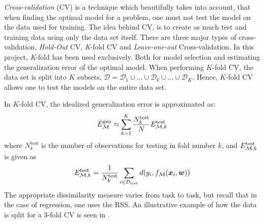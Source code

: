 \emph{Cross-validation} (CV) is a technique which beautifully takes into account, that when finding the optimal model for a problem, one must not test the model on the data used for training. The idea behind CV, is to create as much test and training data using only the data set itself. There are three major types of cross-validation, \emph{Hold-Out} CV, \emph{K}-fold CV and \emph{Leave-one-out} Cross-validation\citep{allhailkingMorten}. In this project, \emph{K}-fold has been used exclusively. Both for model selection and estimating the generalization error of the optimal model. When performing $K$-fold CV, the data set is split into $K$ subsets, $\mathcal{D} = \mathcal{D}_1 \cup  ... \cup \mathcal{D}_k \cup ... \cup \mathcal{D}_K$. Hence, $K$-fold CV allows one to test the models on the entire data set.

In $K$-fold CV, the idealized generalization error  is approximated as:
\begin{equation}\label{eq:gen_error}
    \hat{E}_{\mathcal{M}}^{\mathrm{gen}} \approx \sum_{k=1}^K \dfrac{N_{k}^{\mathrm{test}}}{N}   E_{\mathcal{M},k}^{\mathrm{test}}
\end{equation}
where $N_k^{\mathrm{test}}$ is the number of observations for testing in fold number $k$, and $E_{{\mathcal{M},k}}^{{\mathrm{test}}}$ is given as
\begin{equation}
    E_{{\mathcal{M},k}}^{{\mathrm{test}}} = \dfrac{1}{N_{k}^{\mathrm{test}}} \sum_{i \in \mathcal{D}_{\mathrm{test}}} d\qty(y_i,f_{\mathcal{M}}\qty(\bm{x}_i,\boldsymbol{w}))
\end{equation}
The appropriate dissimilarity measure varies from task to task, but recall that in the case of regression, one uses the RSS. An illustrative example of how the data is split for a $3$-fold CV is seen in .

